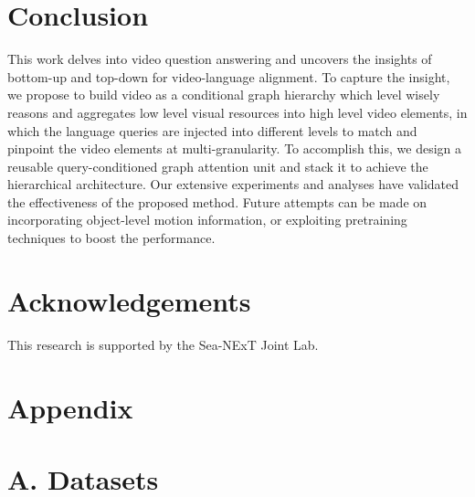 \documentclass[letterpaper]{article} \usepackage{aaai21}  \usepackage{times}  \usepackage{helvet} \usepackage{courier}  \usepackage[hyphens]{url}  \usepackage{graphicx} \urlstyle{rm} \def\UrlFont{\rm}  \usepackage{natbib}  \usepackage{caption} \usepackage{color, colortbl}
\begin{document}
\section{Conclusion}
This work delves into video question answering and uncovers the insights of bottom-up and top-down for video-language alignment. To capture the insight, we propose to build video as a conditional graph hierarchy which level wisely reasons and aggregates low level visual resources into high level video elements, in which the language queries are injected into different levels to match and pinpoint the video elements at multi-granularity. To accomplish this, we design a reusable query-conditioned graph attention unit and stack it to achieve the hierarchical architecture. Our extensive experiments and analyses have validated the effectiveness of the proposed method. Future attempts can be made on incorporating object-level motion information, or exploiting pretraining techniques to boost the performance.

\section*{Acknowledgements}
This research is supported by the Sea-NExT Joint Lab.
\bigskip

\section*{Appendix}
\section{A. Datasets}
\setlength{\tabcolsep}{7pt}
\begin{table*}[t!]
\small
\centering
\begin{threeparttable}
    \caption{Details of the datasets for experiment. OE: open ended. MC: multiple choice.}
\label{tab:dataset}
\end{threeparttable}
\end{table*}
\end{document}
